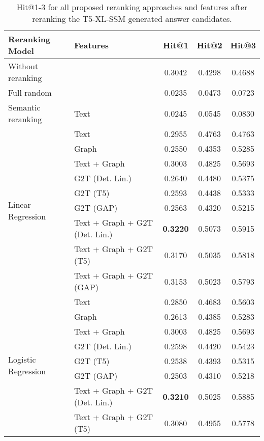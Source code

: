 \begin{table}[htbp]
    \setlength{\tabcolsep}{3pt}
    \caption{Hit@1-3 for all proposed reranking approaches and features after reranking the T5-XL-SSM generated answer candidates.}
    \label{tab:controllable_fusion:t5_xl_ssm_all_results}
    \fontsize{9pt}{11pt}\selectfont
    \centering
    \begin{tabular}{l p{5cm} c c c}
        \toprule
        \textbf{Reranking Model} & \textbf{Features} & \textbf{Hit@1} & \textbf{Hit@2} & \textbf{Hit@3} \\
        \midrule
        Without reranking & & 0.3042 & 0.4298 & 0.4688 \\
        \cmidrule(lr){1-5}
        Full random & & 0.0235 & 0.0473 & 0.0723 \\
        \cmidrule(lr){1-5}
        Semantic reranking & Text & 0.0245 & 0.0545 & 0.0830 \\
        \cmidrule(lr){1-5}
        \multirow{9}{*}{Linear Regression} & Text & 0.2955 & 0.4763 & 0.4763 \\
        & Graph & 0.2550 & 0.4353 & 0.5285 \\
        & Text + Graph & 0.3003 & 0.4825 & 0.5693 \\
        & G2T (Det. Lin.) & 0.2640 & 0.4480 & 0.5375 \\
        & G2T (T5) & 0.2593 & 0.4438 & 0.5333 \\
        & G2T (GAP) & 0.2563 & 0.4320 & 0.5215 \\
        & Text + Graph + G2T (Det. Lin.) & \textbf{0.3220} & 0.5073 & 0.5915 \\
        & Text + Graph + G2T (T5) & 0.3170 & 0.5035 & 0.5818 \\
        & Text + Graph + G2T (GAP) & 0.3153 & 0.5023 & 0.5793 \\
        \midrule
        \multirow{12}{*}{Logistic Regression} & Text & 0.2850 & 0.4683 & 0.5603 \\
        & Graph & 0.2613 & 0.4385 & 0.5283 \\
        & Text + Graph & 0.3003 & 0.4825 & 0.5693 \\
        & G2T (Det. Lin.) & 0.2598 & 0.4420 & 0.5423 \\
        & G2T (T5) & 0.2538 & 0.4393 & 0.5315 \\
        & G2T (GAP) & 0.2503 & 0.4310 & 0.5218 \\
        & Text + Graph + G2T (Det. Lin.) & \textbf{0.3210} & 0.5025 & 0.5885 \\
        & Text + Graph + G2T (T5) & 0.3080 & 0.4955 & 0.5778 \\

\end{tabular}
\end{table}
